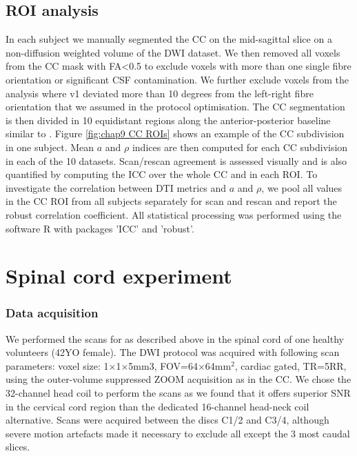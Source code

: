 \subsection{ROI analysis} 
In each subject we manually segmented the \gls{CC} on the mid-sagittal slice on a non-diffusion weighted volume of the \gls{DWI} dataset. We then removed all voxels from the \gls{CC} mask with FA<0.5 to exclude voxels with more than one single fibre orientation or significant CSF contamination. We further exclude voxels from the analysis where v1 deviated more than 10 degrees from the left-right fibre orientation that we assumed in the protocol optimisation. The \gls{CC} segmentation is then divided in 10 equidistant regions along the anterior-posterior baseline similar to \cite{Aboitiz:1992}. Figure \ref{fig:chap9 CC ROIs} shows an example of the \gls{CC} subdivision in one subject. Mean $a$ and $\rho$ indices are then computed for each \gls{CC} subdivision in each of the 10 datasets. Scan/rescan agreement is assessed visually and is also quantified by computing the \gls{ICC} \citep{Shrout:1979} over the whole \gls{CC} and in each \gls{ROI}. To investigate the correlation between DTI metrics and $a$ and $\rho$, we pool all values in the \gls{CC} \gls{ROI} from all subjects separately for scan and rescan and report the robust correlation coefficient\citep{Huber:1996}. All statistical processing was performed using the software R\citep{RCoreTeam:2012} with packages 'ICC'\citep{Wolak:2011} and 'robust'\citep{Wang:2012}.

\section{Spinal cord experiment}
\subsubsection*{Data acquisition}
We performed the scans for \SFasym{} as described above in the spinal cord of one healthy volunteers (42YO female). The \SF{} DWI protocol was acquired with following scan parameters: voxel size: 1$\times$1$\times$5mm3, FOV=64$\times$64mm$^2$, cardiac gated, TR=5RR, using the outer-volume suppressed ZOOM acquisition \citep{Wilm:2007} as in the \gls{CC}. We chose the 32-channel head coil to perform the scans as we found that it offers superior \gls{SNR} in the cervical cord region than the dedicated 16-channel head-neck coil alternative. Scans were acquired between the discs C1/2 and C3/4, although severe motion artefacts made it necessary to exclude all except the 3 most caudal slices. 

